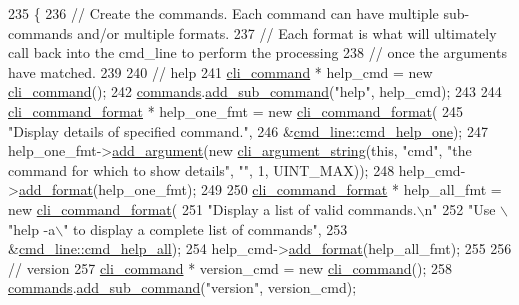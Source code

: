\begin{DoxyCode}
235 \{
236     \textcolor{comment}{// Create the commands. Each command can have multiple sub-commands and/or multiple formats.}
237     \textcolor{comment}{// Each format is what will ultimately call back into the cmd\_line to perform the processing}
238     \textcolor{comment}{// once the arguments have matched.}
239 
240     \textcolor{comment}{// help}
241     \hyperlink{classcli__command}{cli\_command} * help\_cmd = \textcolor{keyword}{new} \hyperlink{classcli__command}{cli\_command}();
242     \hyperlink{classcmd__line_ae4fea670c2fdd2b60f7b5b6ad6fbaf1e}{commands}.\hyperlink{classcli__command_aa73a67e8ebb6facd4b40ced66279b226}{add\_sub\_command}(\textcolor{stringliteral}{"help"}, help\_cmd);
243 
244     \hyperlink{classcli__command__format}{cli\_command\_format} * help\_one\_fmt = \textcolor{keyword}{new} \hyperlink{classcli__command__format}{cli\_command\_format}(
245         \textcolor{stringliteral}{"Display details of specified command."},
246         &\hyperlink{classcmd__line_a9749c9ccd3e99c496d2d44b24227b82e}{cmd\_line::cmd\_help\_one});
247     help\_one\_fmt->\hyperlink{classcli__command__format_ac3fc6d13a227c195d5ee6f7b78eba9cd}{add\_argument}(\textcolor{keyword}{new} \hyperlink{classcli__argument__string}{cli\_argument\_string}(\textcolor{keyword}{this}, \textcolor{stringliteral}{"cmd"}, \textcolor{stringliteral}{"the
       command for which to show details"}, \textcolor{stringliteral}{""}, 1, UINT\_MAX));
248     help\_cmd->\hyperlink{classcli__command_aa9ec38e761644d946f8db2b920e39921}{add\_format}(help\_one\_fmt);
249 
250     \hyperlink{classcli__command__format}{cli\_command\_format} * help\_all\_fmt = \textcolor{keyword}{new} \hyperlink{classcli__command__format}{cli\_command\_format}(
251         \textcolor{stringliteral}{"Display a list of valid commands.\(\backslash\)n"}
252         \textcolor{stringliteral}{"Use \(\backslash\)"help -a\(\backslash\)" to display a complete list of commands"},
253         &\hyperlink{classcmd__line_abaa6762e216240b57fd51f06c0a89a86}{cmd\_line::cmd\_help\_all});
254     help\_cmd->\hyperlink{classcli__command_aa9ec38e761644d946f8db2b920e39921}{add\_format}(help\_all\_fmt);
255 
256     \textcolor{comment}{// version}
257     \hyperlink{classcli__command}{cli\_command} * version\_cmd = \textcolor{keyword}{new} \hyperlink{classcli__command}{cli\_command}();
258     \hyperlink{classcmd__line_ae4fea670c2fdd2b60f7b5b6ad6fbaf1e}{commands}.\hyperlink{classcli__command_aa73a67e8ebb6facd4b40ced66279b226}{add\_sub\_command}(\textcolor{stringliteral}{"version"}, version\_cmd);

\end{DoxyCode}
